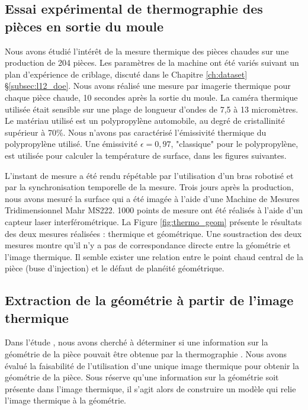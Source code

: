 \subsection{Essai expérimental de thermographie des pièces en sortie du moule}
Nous avons étudié l'intérêt de la mesure thermique des pièces chaudes sur une production de 204 pièces.
Les paramètres de la machine ont été variés suivant un plan d'expérience de criblage, discuté dans le Chapitre \ref{ch:dataset} §\ref{subsec:l12_doe}.
Nous avons réalisé une mesure par imagerie thermique pour chaque pièce chaude, 10 secondes après la sortie du moule.
La caméra thermique utilisée était sensible sur une plage de longueur d'ondes de 7,5 à 13 micromètres.
Le matériau utilisé est un polypropylène automobile, au degré de cristallinité supérieur à 70\%.
Nous n'avons pas caractérisé l'émissivité thermique du polypropylène utilisé.
Une émissivité $\epsilon=0,97$, "classique" pour le polypropylène, est utilisée pour calculer la température de surface, dans les figures suivantes.

L'instant de mesure a été rendu répétable par l'utilisation d'un bras robotisé et par la synchronisation temporelle de la mesure.
Trois jours après la production, nous avons mesuré la surface qui a été imagée à l'aide d'une Machine de Mesures Tridimensionnel Mahr MS222.
1000 points de mesure ont été réalisés à l'aide d'un capteur laser interférométrique.
La Figure \ref{fig:thermo_geom} présente le résultats des deux mesures réalisées : thermique et géométrique.
Une soustraction des deux mesures montre qu'il n'y a pas de correspondance directe entre la géométrie et l'image thermique.
Il semble exister une relation entre le point chaud central de la pièce (buse d'injection) et le défaut de planéité géométrique.

\subsection{Extraction de la géométrie à partir de l'image thermique}
Dans l'étude , nous avons cherché à déterminer si une information sur la géométrie de la pièce pouvait être obtenue par la thermographie \cite{nagorny_generative_2018}.
Nous avons évalué la faisabilité de l'utilisation d'une unique image thermique pour obtenir la géométrie de la pièce.
Sous réserve qu'une information sur la géométrie soit présente dans l'image thermique, il s'agit alors de construire un modèle qui relie l'image thermique à la géométrie.

